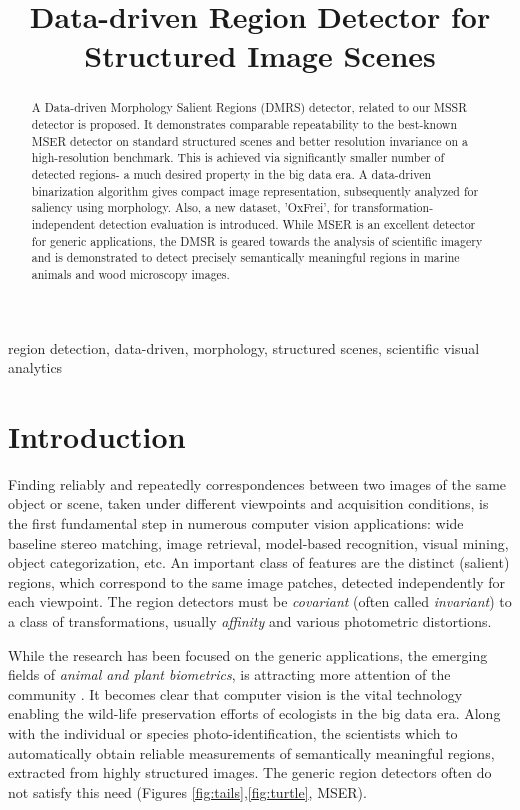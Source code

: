 \documentclass{article}
\title{Data-driven Region Detector for Structured Image Scenes}
\begin{document}
\maketitle

\begin{abstract}
A Data-driven Morphology Salient Regions (DMRS) detector, related to our MSSR detector is proposed.
It demonstrates comparable repeatability to the best-known MSER detector on standard structured scenes and better resolution invariance on a high-resolution benchmark. This is achieved via significantly smaller number of detected regions- a much desired property in the big data era. A data-driven binarization algorithm gives compact image representation, subsequently analyzed for saliency using morphology.  Also, a new dataset, 'OxFrei', for transformation-independent detection evaluation is introduced.
While MSER is an excellent detector for generic applications, the DMSR is geared towards the analysis of scientific imagery and is demonstrated to detect precisely semantically meaningful regions in marine animals and wood microscopy images.

\end{abstract}

\begin{keywords}
region detection, data-driven, morphology, structured scenes, scientific visual analytics
\end{keywords}

\section{Introduction}
\label{sec:intro}
Finding reliably and repeatedly correspondences between two images of the same object or scene, taken under different viewpoints and acquisition conditions, is the first fundamental step in numerous computer vision applications: wide baseline stereo matching, image retrieval, model-based recognition, visual mining, object categorization, etc. An important class of features are the distinct (salient) regions, which correspond to the same image patches, detected independently for each viewpoint. The region detectors must be {\em covariant} (often called {\em invariant}) to a class of transformations, usually {\em affinity} and various photometric distortions. 

While the research has been focused on the generic applications, the emerging fields of {\em animal and plant biometrics}, is attracting more attention of the community \cite{Kuehl2013, leafsnap_eccv2012}. It becomes clear that computer vision is the vital technology enabling the wild-life preservation efforts of ecologists in the big data era. Along with the individual or species photo-identification, the scientists which to automatically obtain reliable measurements of semantically meaningful regions, extracted from highly structured images. The generic region detectors often do not satisfy this need (Figures \ref{fig:tails},\ref{fig:turtle}, MSER).
\end{document}
